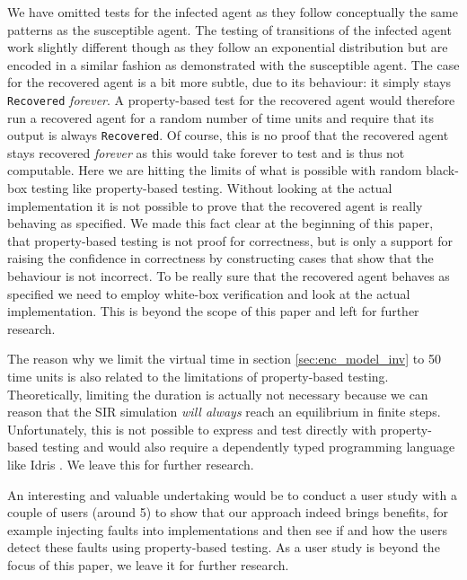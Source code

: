 We have omitted tests for the infected agent as they follow conceptually the same patterns as the susceptible agent. The testing of transitions of the infected agent work slightly different though as they follow an exponential distribution but are encoded in a similar fashion as demonstrated with the susceptible agent. The case for the recovered agent is a bit more subtle, due to its behaviour: it simply stays \texttt{Recovered} \textit{forever}. A property-based test for the recovered agent would therefore run a recovered agent for a random number of time units and require that its output is always \texttt{Recovered}. Of course, this is no proof that the recovered agent stays recovered \textit{forever} as this would take forever to test and is thus not computable. Here we are hitting the limits of what is possible with random black-box testing like property-based testing. Without looking at the actual implementation it is not possible to prove that the recovered agent is really behaving as specified. We made this fact clear at the beginning of this paper, that property-based testing is not proof for correctness, but is only a support for raising the confidence in correctness by constructing cases that show that the behaviour is not incorrect. To be really sure that the recovered agent behaves as specified we need to employ white-box verification and look at the actual implementation. This is beyond the scope of this paper and left for further research.

The reason why we limit the virtual time in section \ref{sec:enc_model_inv} to 50 time units is also related to the limitations of property-based testing. Theoretically, limiting the duration is actually not necessary because we can reason that the SIR simulation \textit{will always} reach an equilibrium in finite steps. Unfortunately, this is not possible to express and test directly with property-based testing and would also require a dependently typed programming language like Idris \cite{brady_idris_2013,brady_type-driven_2017}. We leave this for further research.

An interesting and valuable undertaking would be to conduct a user study with a couple of users (around 5) to show that our approach indeed brings benefits, for example injecting faults into implementations and then see if and how the users detect these faults using property-based testing. As a user study is beyond the focus of this paper, we leave it for further research.